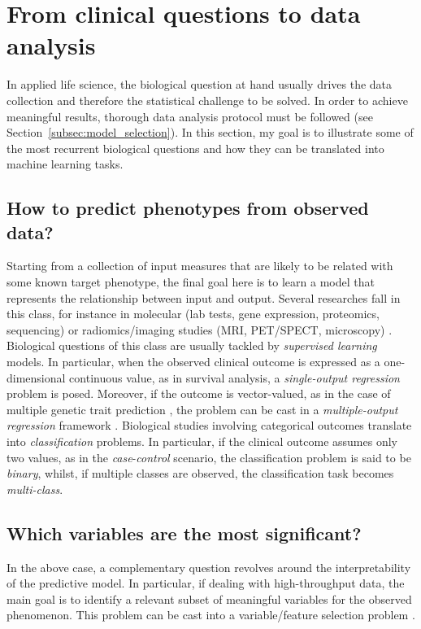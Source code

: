 \section{From clinical questions to data analysis} \label{sec:clinical_to_data}
In applied life science, the biological question at hand usually drives the data collection and therefore the statistical challenge to be solved. In order to achieve meaningful results, thorough data analysis protocol must be followed (see Section~\ref{subsec:model_selection}).
In this section, my goal is to illustrate some of the most recurrent biological questions and how they can be translated into machine learning tasks.


\subsection{How to predict phenotypes from observed data?} %
Starting from a collection of input measures that are likely to be related with some known target phenotype, the final goal here is to learn a model that represents the relationship between input and output. Several researches fall in this class, for instance in molecular (\eg lab tests, gene expression, proteomics, sequencing) \cite{angermueller2016deep, okser2014regularized, abraham2013performance} or radiomics/imaging studies (\eg \ac{MRI}, \ac{PET}/\ac{SPECT}, microscopy) \cite{min2016deep, helmstaedter2013connectomic}. Biological questions of this class are usually tackled by \textit{supervised learning} models. In particular, when the observed clinical outcome is expressed as a one-dimensional continuous value, as in survival analysis, a \textit{single-output regression} problem is posed. Moreover, if the outcome is vector-valued, as in the case of multiple genetic trait prediction \cite{he2016novel}, the problem can be cast in a \textit{multiple-output regression }framework \cite{argyriou2008convex, baldassarre2012multi}. Biological studies involving categorical outcomes translate into \textit{classification} problems. In particular, if the clinical outcome assumes only two values, as in the \textit{case}-\textit{control} scenario, the classification problem is said to be \textit{binary}, whilst, if multiple classes are observed, the classification task becomes \textit{multi-class}.

\subsection{Which variables are the most significant?} %
In the above case, a complementary question revolves around the interpretability of the predictive model. In particular, if dealing with high-throughput data, the main goal is to identify a relevant subset of meaningful variables for the observed phenomenon. This problem can be cast into a variable/feature selection problem \cite{guyon2002gene}. %

